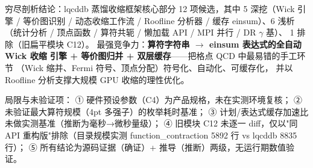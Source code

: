 \documentclass[UTF8]{ctexart}
\begin{document}
\begin{conclbox}
穷尽剖析结论：lqcddb 蒸馏收缩框架核心部分 12 项候选，其中
\textcolor{algo}{5 深挖}（Wick 引擎 / 等价图识别 / 动态收缩工作流 /
Roofline 分析器 / 缓存 einsum）、\textcolor{phys}{6 浅析}（统计分析 /
顶点函数 / 算符共轭 / 懒加载 API / MPI 并行 / DR $\gamma$ 基）、
\textcolor{conclusion}{1 排除}（旧扁平模块 C12）。
最强竞争力：\textbf{算符字符串 $\to$ einsum 表达式的全自动 Wick 收缩
引擎 + 等价图归并 + 双层缓存}——把格点 QCD 中最易错的手工环节
（Wick 缩并、Fermi 符号、顶点分配）符号化、自动化、可缓存化，
并以 Roofline 分析支撑大规模 GPU 收缩的理性优化。
\end{conclbox}

\begin{warnbox}
局限与未验证项：\quad
① 硬件预设参数（C4）为产品规格，未在实测环境复核；
② \textcolor{warn}{未验证}最大算符规模（4pt 多强子）的枚举耗时基准；
③ 计划/表达式缓存加速比未做实测基准（推断为毫秒→微秒量级）；
④ 旧模块 C12 未逐一 diff，仅以"同 API 重构版"排除（目录规模实测
function\_contraction 5892 行 vs lqcddb 8835 行）；
⑤ 所有结论为源码证据（确证）+ 推导（推断）两级，无运行期数值验证。
\end{warnbox}
\end{document}
